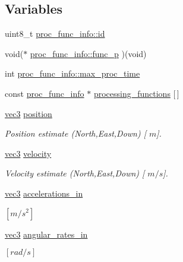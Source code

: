 \subsection*{\-Variables}
\begin{DoxyCompactItemize}
\item 
uint8\-\_\-t \hyperlink{group__tables_ga133713acbe60983f171f71e2d81fae3f}{proc\-\_\-func\-\_\-info\-::id}
\item 
void($\ast$ \hyperlink{group__tables_gab0d228e3d6f56666fb9d9bf0f25f8d7b}{proc\-\_\-func\-\_\-info\-::func\-\_\-p} )(void)
\item 
int \hyperlink{group__tables_ga128ad5d7538eef603b5f0dab9c42174b}{proc\-\_\-func\-\_\-info\-::max\-\_\-proc\-\_\-time}
\item 
const \hyperlink{structproc__func__info}{proc\-\_\-func\-\_\-info} $\ast$ \hyperlink{group__tables_ga41846acfd74bdde84b592227e9875931}{processing\-\_\-functions} \mbox{[}$\,$\mbox{]}
\item 
\hyperlink{nav__types_8h_a90c683614d896321009d3b3c401b764f}{vec3} \hyperlink{group__tables_ga2807b9fb4b79e01dfde022b613d2575f}{position}
\begin{DoxyCompactList}\small\item\em \-Position estimate (\-North,\-East,\-Down) \mbox{[} $m$\mbox{]}. \end{DoxyCompactList}\item 
\hyperlink{nav__types_8h_a90c683614d896321009d3b3c401b764f}{vec3} \hyperlink{group__tables_ga589efe00d8bd4e8a69613f98390a04c7}{velocity}
\begin{DoxyCompactList}\small\item\em \-Velocity estimate (\-North,\-East,\-Down) \mbox{[} $m/s$\mbox{]}. \end{DoxyCompactList}\item 
\hyperlink{nav__types_8h_a90c683614d896321009d3b3c401b764f}{vec3} \hyperlink{group__tables_gaf92cab44915b7d9faaf5aeadb328bae6}{accelerations\-\_\-in}
\begin{DoxyCompactList}\small\item\em $[m/s^2]$ \end{DoxyCompactList}\item 
\hyperlink{nav__types_8h_a90c683614d896321009d3b3c401b764f}{vec3} \hyperlink{group__tables_ga8cac4b2812dcb492989d7122c5eb0bfb}{angular\-\_\-rates\-\_\-in}
\begin{DoxyCompactList}\small\item\em $[rad/s]$ \end{DoxyCompactList}\item 

\end{DoxyCompactItemize}
